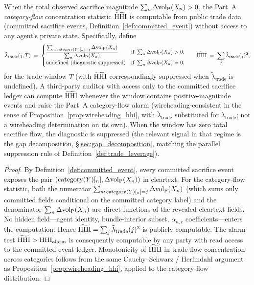 \begin{proposition}
\label{prop:third_party_wireheading}
When the total observed sacrifice magnitude
$\sum_n \Delta{\operatorname{vol}_{\mathrm{P}}}(X_n) > 0$, the Part~A \emph{category-flow}
concentration statistic $\widetilde{\mathrm{HHI}}$ is computable from
public trade data (committed sacrifice events,
Definition~\ref{def:committed_event}) without access to any
agent's private state.  Specifically, define
\[
  \tilde\lambda_{\mathrm{trade}}(j, T) \;=\;
  \begin{cases}
    \dfrac{\sum_{n :\, \mathrm{category}(Y)[_n] = j} \Delta{\operatorname{vol}_{\mathrm{P}}}(X_n)}
         {\sum_n \Delta{\operatorname{vol}_{\mathrm{P}}}(X_n)}
      & \text{if } \sum_n \Delta{\operatorname{vol}_{\mathrm{P}}}(X_n) > 0, \\
    \text{undefined (diagnostic suppressed)}
      & \text{if } \sum_n \Delta{\operatorname{vol}_{\mathrm{P}}}(X_n) = 0,
  \end{cases}
  \qquad
  \widetilde{\mathrm{HHI}} \;=\; \sum_j \tilde\lambda_{\mathrm{trade}}(j)^2,
\]
for the trade window $T$ (with $\widetilde{\mathrm{HHI}}$ correspondingly
suppressed when $\tilde\lambda_{\mathrm{trade}}$ is undefined).
A third-party auditor with access only to the committed
sacrifice ledger can compute $\widetilde{\mathrm{HHI}}$ whenever the
window contains positive-magnitude events and raise the Part~A
category-flow alarm (wireheading-consistent in the sense of
Proposition~\ref{prop:wireheading_hhi}, with
$\tilde\lambda_{\mathrm{trade}}$ substituted for
$\lambda_{\mathrm{trade}}$; not a wireheading determination on
its own).  When the window has zero total sacrifice flow, the
diagnostic is suppressed (the relevant signal in that regime is
the gap decomposition, \S\ref{sec:gap_decomposition}, matching
the parallel suppression rule of
Definition~\ref{def:trade_leverage}).
\end{proposition}

\begin{proof}
By Definition~\ref{def:committed_event}, every committed
sacrifice event exposes the pair $(\mathrm{category}(Y)[_n], \Delta{\operatorname{vol}_{\mathrm{P}}}(X_n))$
in cleartext.  For the category-flow statistic, both the
numerator $\sum_{n :\, \mathrm{category}(Y)[_n] = j} \Delta{\operatorname{vol}_{\mathrm{P}}}(X_n)$ (which
sums only committed fields conditional on the committed category
label) and the denominator $\sum_n \Delta{\operatorname{vol}_{\mathrm{P}}}(X_n)$ are direct
functions of the revealed-cleartext fields.  No hidden
field---agent identity, bundle-interior subset, $\alpha_{n,c}$
coefficients---enters the computation.  Hence
$\widetilde{\mathrm{HHI}} = \sum_j \tilde\lambda_{\mathrm{trade}}(j)^2$ is
publicly computable.  The alarm test
$\widetilde{\mathrm{HHI}} > \mathrm{HHI}_{\mathrm{alarm}}$ is consequently
computable by any party with read access to the committed-event
ledger.  Monotonicity of $\widetilde{\mathrm{HHI}}$ in trade-flow
concentration across categories follows from the same
Cauchy--Schwarz / Herfindahl argument as
Proposition~\ref{prop:wireheading_hhi}, applied to the
category-flow distribution.
\end{proof}

